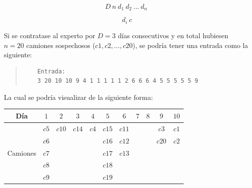 \documentclass[11pt, a4paper, twoside]{article}
\begin{document}
\begin{minipage}[t]{0.5\textwidth}
\[
  D\ n\ d_{1}\ d_{2}\ ...\ d_{n}\
\]

\end{minipage}
\begin{minipage}[t]{0.5\textwidth}
\[
  d_{i}\ c
\]

\end{minipage}

\newpage
{}

\begin{ejemplo}\hspace{0em}

Si se contratase al experto por $D=3$ días consecutivos y en total hubiesen $n=20$
camiones sospechosos ($c1,c2,...,c20$), se podría tener una entrada como la siguiente:

  \begin{quote}
    \begin{verbatim}
    Entrada:
    3 20 10 10 9 4 1 1 1 1 1 2 6 6 6 4 5 5 5 5 5 9
    \end{verbatim}
  \end{quote}

  \vspace{-2em}
    \begin{center}
      La cual se podría visualizar de la siguiente forma:

      \renewcommand{\arraystretch}{1.2} %
      \begin{tabular}{|c|c|c|c|c|c|c|c|c|c|c|}
        \hline
        Día          &  $1$  & $2$   & $3$   & $4$   & $5$   & $6$ & $7$ & $8$ & $9$   & $10$  \\
        \hline
                     & $c5$ & $c10$ & $c14$ & $c4$ & $c15$ & $c11$ &   &     & $c3$  & $c1$  \\
                     & $c6$ &       &       &       & $c16$ & $c12$ &   &     & $c20$ & $c2$  \\
        Camiones     & $c7$ &       &       &       & $c17$ & $c13$ &   &     &       &       \\
                     & $c8$ &       &       &       & $c18$ &       &   &     &       &       \\
                     & $c9$ &       &       &       & $c19$ &       &   &     &       &       \\
        \hline
      \end{tabular}
    \end{center}


\end{ejemplo}
\end{document}
